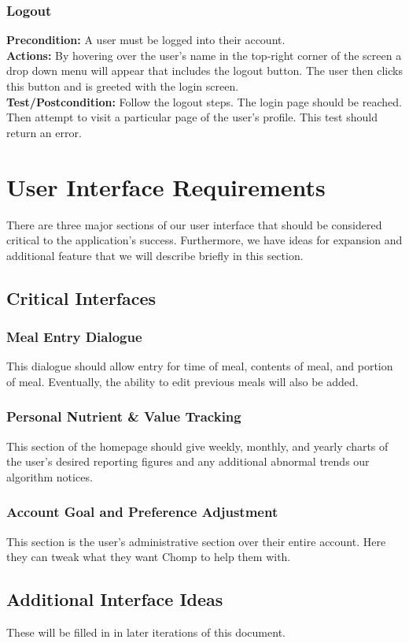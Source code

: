 \documentclass[a4paper,12pt]{article}
\begin{document}
\subsubsection{Logout}
\textbf{Precondition:} A user must be logged into their account.\\
\textbf{Actions:} By hovering over the user's name in the top-right corner of the screen a drop down menu will appear that includes the logout button.  The user then clicks this button and is greeted with the login screen.\\
\textbf{Test/Postcondition:} Follow the logout steps.  The login page should be reached.  Then attempt to visit a particular page of the user's profile.  This test should return an error.
\section{User Interface Requirements}
There are three major sections of our user interface that should be considered critical to the application's success.  Furthermore, we have ideas for expansion and additional feature that we will describe briefly in this section.
\subsection{Critical Interfaces}
\subsubsection{Meal Entry Dialogue}
This dialogue should allow entry for time of meal, contents of meal, and portion of meal.  Eventually, the ability to edit previous meals will also be added.
\subsubsection{Personal Nutrient \& Value Tracking}
This section of the homepage should give weekly, monthly, and yearly charts of the user's desired reporting figures and any additional abnormal trends our algorithm notices.
\subsubsection{Account Goal and Preference Adjustment}
This section is the user's administrative section over their entire account.  Here they can tweak what they want Chomp to help them with.
\subsection{Additional Interface Ideas}
These will be filled in in later iterations of this document.
\end{document}
